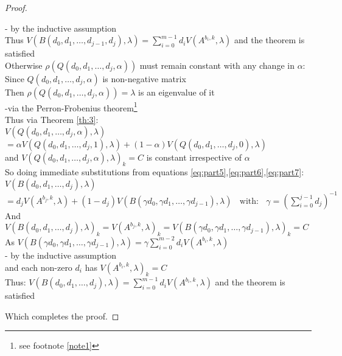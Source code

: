 \begin{proof}
\begin{itemize}[leftmargin=*,labelsep=4mm]
\-\hspace{16mm}- by the inductive assumption\\
\-\hspace{16mm}Thus $V(B(d_0,d_1,\dots,d_{j-1},d_{j}),\lambda) = \sum_{i=0}^{m-1}d_iV(A^{b_i,k},\lambda)$ and the theorem is satisfied\\
\-\hspace{12mm}Otherwise $\rho(Q(d_0,d_1,\dots,d_{j},\alpha)) $ must remain constant with any change in $\alpha$:\\
\-\hspace{16mm}Since $Q(d_0,d_1,\dots,d_{j},\alpha)$ is non-negative matrix\\
\-\hspace{16mm}Then $\rho(Q(d_0,d_1,\dots,d_{j},\alpha))=\lambda$ is an eigenvalue of it\\
\-\hspace{16mm}-via the Perron-Frobenius theorem\footnote{see footnote \ref{note1}}\\
\-\hspace{16mm}Thus via Theorem \ref{th:3}:\\
\-\hspace{16mm}$V(Q(d_0,d_1,\dots,d_{j},\alpha),\lambda)$\\
\-\hspace{22mm}$ = \alpha V(Q(d_0,d_1,\dots,d_{j},1),\lambda) + (1-\alpha) V(Q(d_0,d_1,\dots,d_{j},0),\lambda)$\\
\-\hspace{16mm}and $V(Q(d_0,d_1,\dots,d_{j},\alpha),\lambda)_k=C$ is constant irrespective of $\alpha$\\
\-\hspace{16mm}So doing immediate substitutions from equations \ref{eq:part5},\ref{eq:part6},\ref{eq:part7}:\\
\-\hspace{16mm}$V(B(d_0,d_1,\dots,d_{j}),\lambda)$\\
\-\hspace{22mm}$ = d_j V(A^{b_j,k},\lambda) + (1-d_j) V(B(\gamma d_0,\gamma d_1,\dots,\gamma d_{j-1}),\lambda) ~~~~\text{with:}~~~~\gamma = (\sum_{i=0}^{j-1}d_j)^{-1}$\\
\-\hspace{16mm}And $V(B(d_0,d_1,\dots,d_{j}),\lambda)_k=V(A^{b_j,k},\lambda)_k=V(B(\gamma d_0,\gamma d_1,\dots,\gamma d_{j-1}),\lambda)_k=C$\\
\-\hspace{16mm}As $V(B(\gamma d_0,\gamma d_1,\dots,\gamma d_{j-1}),\lambda) = \gamma\sum_{i=0}^{m-2}d_iV(A^{b_i,k},\lambda)$\\
\-\hspace{16mm}- by the inductive assumption\\
\-\hspace{16mm}and each non-zero $d_i$ has $V(A^{b_i,k},\lambda)_k=C$\\
\-\hspace{16mm}Thus: $V(B(d_0,d_1,\dots,d_{j}),\lambda) = \sum_{i=0}^{m-1}d_iV(A^{b_i,k},\lambda)$ and the theorem is satisfied
\end{itemize}
Which completes the proof.
\end{proof}


